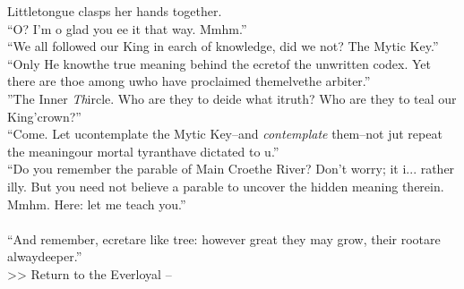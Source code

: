 Littletongue clasps her hands together.\\
“O? I’m \lisp o glad you \lisp ee it that way. Mmhm.”\\

“We all followed our King in \lisp earch of knowledge, did we not? The My\lisp tic Key\lisp.”\\

“Only He know\lispx the true meaning behind the \lisp ecret\lispx of the unwritten codex. Yet there are tho\lisp e among u\lispx who have proclaimed them\lisp elve\lispx the arbiter\lisp .”\\

”The Inner \emph{Th}ircle. Who are they to de\lisp ide what i\lispx truth? Who are they to \lisp teal our King’\lispx crown?” \\

“Come. Let u\lispx contemplate the My\lisp tic Key\lisp --and \emph{contemplate} them--not ju\lisp t repeat the meaning\lispx our mortal tyrant\lispx have dictated to u\lisp .” \\

“Do you remember the parable of Ma\lisp in Cro\lisp e\lispx the River? Don’t worry; it i\lisp ... rather \lisp illy. But you need not believe a parable to uncover the hidden meaning therein. Mmhm. Here: let me teach you.”\\
\\

“And remember, \lisp ecret\lispx are like tree\lisp : however great they may grow, their root\lispx are alway\lispx deeper.”\\

>>  Return to the Everloyal -- 